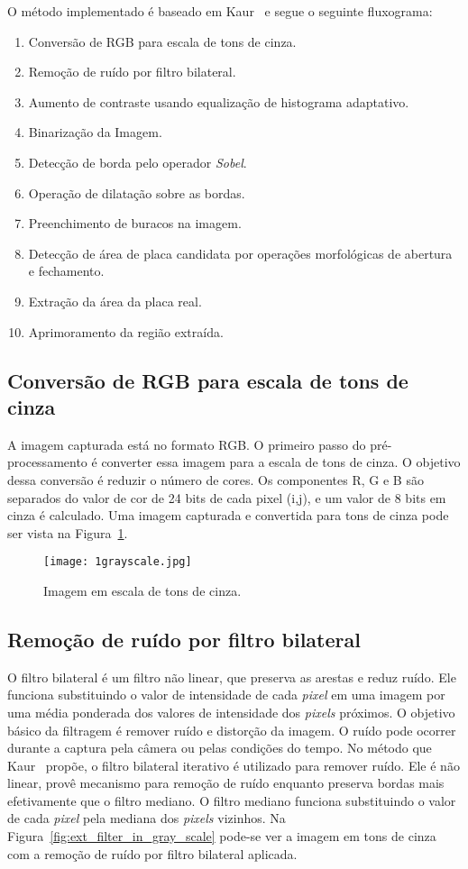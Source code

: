 O método implementado é baseado em Kaur~\cite{kaur2014efficient} e segue o seguinte fluxograma:

\begin{enumerate}
	\item Conversão de RGB para escala de tons de cinza.
	\item Remoção de ruído por filtro bilateral.
	\item Aumento de contraste usando equalização de histograma adaptativo.
	\item Binarização da Imagem.
	\item Detecção de borda pelo operador \emph{Sobel}.
    \item Operação de dilatação sobre as bordas.
    \item Preenchimento de buracos na imagem.
	\item Detecção de área de placa candidata por operações morfológicas de abertura e fechamento.
	\item Extração da área da placa real.
    \item Aprimoramento da região extraída.
\end{enumerate}

\subsection{Conversão de RGB para escala de tons de cinza}

A imagem capturada está no formato RGB\@. O primeiro passo do pré-processamento é converter essa imagem para a escala de tons de cinza. O objetivo dessa conversão é reduzir o número de cores. Os componentes R, G e B são separados do valor de cor de 24 bits de cada pixel (i,j), e um valor de 8 bits em cinza é calculado. Uma imagem capturada e convertida para tons de cinza pode ser vista na Figura~\ref{fig:ext_gray_scale}.

\begin{figure}[H]
	\centering
	\texttt{[image: 1grayscale.jpg]}
	\caption{Imagem em escala de tons de cinza.}
	\label{fig:ext_gray_scale}
\end{figure}

\subsection{Remoção de ruído por filtro bilateral}

O filtro bilateral é um filtro não linear, que preserva as arestas e reduz ruído. Ele funciona substituindo o valor de intensidade de cada \emph{pixel} em uma imagem por uma média ponderada dos valores de intensidade dos \emph{pixels} próximos. O objetivo básico da filtragem é remover ruído e distorção da imagem. O ruído pode ocorrer durante a captura pela câmera ou pelas condições do tempo. No método que Kaur~\cite{kaur2014efficient} propõe, o filtro bilateral iterativo é utilizado para remover ruído. Ele é não linear, provê mecanismo para remoção de ruído enquanto preserva bordas mais efetivamente que o filtro mediano. O filtro mediano funciona substituindo o valor de cada \emph{pixel} pela mediana dos \emph{pixels} vizinhos. Na Figura~\ref{fig:ext_filter_in_gray_scale} pode-se ver a imagem em tons de cinza com a remoção de ruído por filtro bilateral aplicada.

